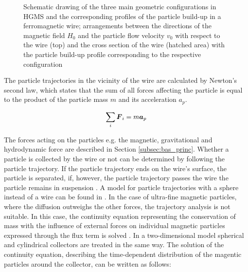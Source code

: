 \begin{figure}[h]
\centering

\caption[Geometric configurations in HGMS and particle build-up]{Schematic drawing of the three main geometric configurations in HGMS and the corresponding profiles of the particle build-up in a ferromagnetic wire; arrangements between the directions of the magnetic field $H_{0}$ and the particle flow velocity $v_{0}$ with respect to the wire (top) and the cross section of the wire (hatched area) with the particle build-up profile corresponding to the respective configuration \cite{svoboda2004magnetic}
\label{fig:hgms_config}
}
\end{figure}

The particle trajectories in the vicinity of the wire are calculated by Newton's second law, which states that the sum of all forces affecting the particle is equal to the product of the particle mass $m$ and its acceleration $a_{p}$. 

\begin{equation}
\label{eq:mag_force_sum}
\centering
\sum_{i}\boldsymbol{F}_{i} = m\boldsymbol{a}_{p}
\end{equation}
 
The forces acting on the particles e.g. the magnetic, gravitational and hydrodynamic force are described in Section \ref{subsec:bas_princ}. Whether a particle is collected by the wire or not can be determined by following the particle trajectory. If the particle trajectory ends on the wire's surface, the particle is separated, if, however, the particle trajectory passes the wire the particle remains in suspension \cite{FranzrebHabil}. A model for particle trajectories with a sphere instead of a wire can be found in \cite{friedlaender1981particle,moyer1986filtration}. \newline 
In the case of ultra-fine magnetic particles, where the diffusion outweighs the other forces, the trajectory analysis is not suitable. In this case, the continuity equation representing the conservation of mass with the influence of external forces on individual magnetic particles expressed through the flux term is solved \cite{choomphon2017simulation}. In a two-dimensional model spherical and cylindrical collectors are treated in the same way. The solution of the continuity equation, describing the time-dependent distribution of the magentic particles around the collector, can be written as follows:     

